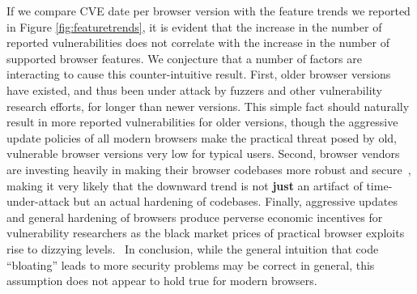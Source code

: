 If we compare CVE date per browser version with the feature trends we
reported in Figure \ref{fig:featuretrends}, it is evident that the
increase in the number of reported vulnerabilities does not correlate
with the increase in the number of supported browser features.  We
conjecture that a number of factors are interacting to cause this
counter-intuitive result.  First, older browser versions have existed,
and thus been under attack by fuzzers and other vulnerability research
efforts, for longer than newer versions. This simple fact should
naturally result in more reported vulnerabilities for older versions,
though the aggressive update policies of all modern browsers make the
practical threat posed by old, vulnerable browser versions very low for
typical users.  Second, browser vendors are investing heavily in making
their browser codebases more robust and
secure~\cite{FirefoxCrashes,ChromeSecure}, making it very likely that
the downward trend is not \textbf{just} an artifact of time-under-attack
but an actual hardening of codebases.  Finally, aggressive updates and
general hardening of browsers produce perverse economic incentives for
vulnerability researchers as the black market prices of practical
browser exploits rise to dizzying
levels.~\cite{noauthor_zerodium_nodate} In conclusion, while the
general intuition that code ``bloating'' leads to more security problems
may be correct in general, this assumption does not appear to hold true
for modern browsers.

